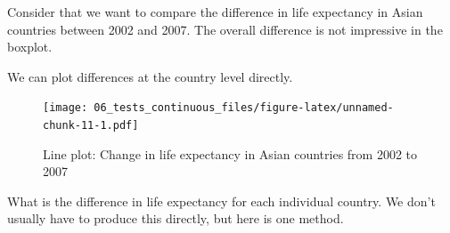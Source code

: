 \documentclass[12pt,]{krantz}
\makeatletter
\newenvironment{Shaded}{\begin{snugshade}}{\end{snugshade}}
\newcommand{\CommentTok}[1]{\textcolor[rgb]{0.56,0.35,0.01}{\textit{#1}}}
\newcommand{\DataTypeTok}[1]{\textcolor[rgb]{0.13,0.29,0.53}{#1}}
\newcommand{\DecValTok}[1]{\textcolor[rgb]{0.00,0.00,0.81}{#1}}
\newcommand{\KeywordTok}[1]{\textcolor[rgb]{0.13,0.29,0.53}{\textbf{#1}}}
\newcommand{\NormalTok}[1]{#1}
\newcommand{\OperatorTok}[1]{\textcolor[rgb]{0.81,0.36,0.00}{\textbf{#1}}}
\newcommand{\StringTok}[1]{\textcolor[rgb]{0.31,0.60,0.02}{#1}}
\newenvironment{kframe}{%
\medskip{}
\setlength{\fboxsep}{.8em}
 \def\at@end@of@kframe{}%
 \ifinner\ifhmode%
  \def\at@end@of@kframe{\end{minipage}}%
  \begin{minipage}{\columnwidth}%
 \fi\fi%
 \def\FrameCommand##1{\hskip\@totalleftmargin \hskip-\fboxsep
 \colorbox{shadecolor}{##1}\hskip-\fboxsep
     \hskip-\linewidth \hskip-\@totalleftmargin \hskip\columnwidth}%
 \MakeFramed {\advance\hsize-\width
   \@totalleftmargin\z@ \linewidth\hsize
   \@setminipage}}%
 {\par\unskip\endMakeFramed%
 \at@end@of@kframe}
\renewenvironment{Shaded}{\begin{kframe}}{\end{kframe}}
\theoremstyle{definition}
\theoremstyle{definition}
\theoremstyle{definition}
\theoremstyle{remark}
\makeatother
\begin{document}

Consider that we want to compare the difference in life expectancy in
Asian countries between 2002 and 2007. The overall difference is not
impressive in the boxplot.

We can plot differences at the country level directly.

\begin{Shaded}
\end{Shaded}

\begin{figure}
\centering
\texttt{[image: 06\_tests\_continuous\_files/figure-latex/unnamed-chunk-11-1.pdf]}
\caption{\label{fig:unnamed-chunk-11}Line plot: Change in life expectancy in
Asian countries from 2002 to 2007}
\end{figure}

 

What is the difference in life expectancy for each individual country.
We don't usually have to produce this directly, but here is one method.

\begin{Shaded}
\end{Shaded}
\end{document}
